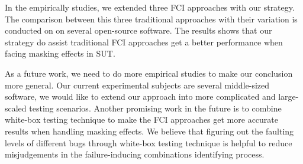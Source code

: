 \documentclass{sig-alternate}
\begin{document}
In the empirically studies, we extended three FCI approaches with our strategy. The comparison between this three traditional approaches with their variation is conducted on on several open-source software. The results shows that our strategy do assist traditional FCI approaches get a better performance when facing masking effects in SUT.

As a future work, we need to do more empirical studies to make our conclusion more general. Our current experimental subjects are several middle-sized software, we would like to extend our approach into more complicated and large-scaled testing scenarios. Another promising work in the future is to combine white-box testing technique to make the FCI approaches get more accurate results when handling masking effects. We believe that figuring out the faulting levels of different bugs through white-box testing technique is helpful to reduce misjudgements in the failure-inducing combinations identifying process.


\end{document}
